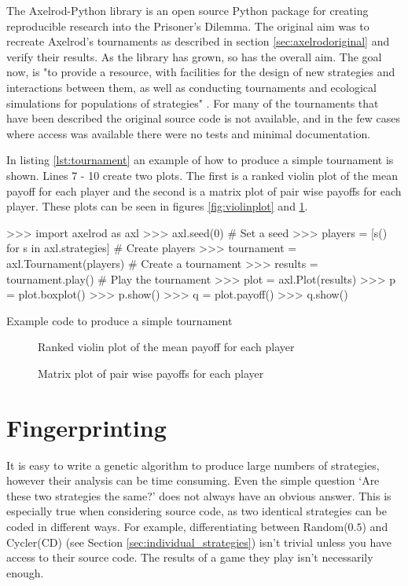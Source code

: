 The Axelrod-Python library \cite{axelrodproject} is an open source Python package for creating reproducible research into the Prisoner's Dilemma.
The original aim was to recreate Axelrod's tournaments as described in section \ref{sec:axelrodoriginal} and verify their results.
As the library has grown, so has the overall aim.
The goal now, is "to provide a resource, with facilities for the design of new strategies and interactions between them, as well as conducting tournaments and ecological simulations for populations of strategies" \cite{Knight2016}.
For many of the tournaments that have been described the original source code is not available, and in the few cases where access was available there were no tests and minimal documentation.

In listing \ref{lst:tournament} an example of how to produce a simple tournament is shown.
Lines 7 - 10 create two plots.
The first is a ranked violin plot of the mean payoff for each player and the second is a matrix plot of pair wise payoffs for each player.
These plots can be seen in figures \ref{fig:violinplot} and \ref{fig:matrixplot}.

\begin{listing}[htbp!]
\begin{ExampleCode}
>>> import axelrod as axl
>>> axl.seed(0)  # Set a seed
>>> players = [s() for s in axl.strategies]  # Create players
>>> tournament = axl.Tournament(players)  # Create a tournament
>>> results = tournament.play()  # Play the tournament
>>> plot = axl.Plot(results)
>>> p = plot.boxplot()
>>> p.show()
>>> q = plot.payoff()
>>> q.show()
\end{ExampleCode}
\caption{Example code to produce a simple tournament}
\label{lst:tournament}
\end{listing}

\begin{figure}
\begin{center}
\caption{Ranked violin plot of the mean payoff for each player}
\label{fig:violinplot}
\end{center}

\begin{center}
\caption{Matrix plot of pair wise payoffs for each player}
\label{fig:matrixplot}
\end{center}
\end{figure}


\section{Fingerprinting}\label{sec:fingerprinting}
It is easy to write a genetic algorithm to produce large numbers of strategies, however their analysis can be time consuming.
Even the simple question `Are these two strategies the same?' does not always have an obvious answer.
This is especially true when considering source code, as two identical strategies can be coded in different ways.
For example, differentiating between Random($0.5$) and Cycler(CD) (see Section \ref{sec:individual_strategies}) isn't trivial unless you have access to their source code.
The results of a game they play isn't necessarily enough.

